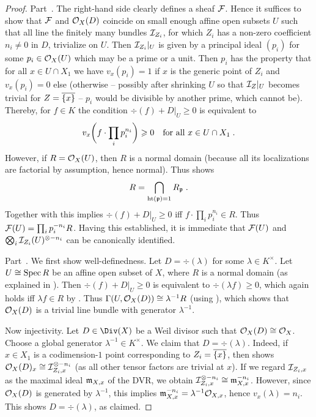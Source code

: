 \documentclass[a4paper,parskip=half,numbers=enddot, DIV=12]{scrreprt}
\renewcommand{\geq}{\geqslant}
\begin{document}
\begin{proof}
	Part~. The right-hand side clearly defines a sheaf $\mathcal{F}$. Hence it suffices to show that $\mathcal{F}$ and $\mathcal{O}_X(D)$ coincide on small enough affine open subsets $U$ such that all line the finitely many bundles $\mathcal{I}_{Z_i}$, for which $Z_i$ has a non-zero coefficient $n_i\neq 0$ in $D$, trivialize on $U$. Then $\mathcal{I}_{Z_i}|_U$ is given by a principal ideal $(p_i)$ for some $p_i\in\mathcal{O}_X(U)$ which may be a prime or a unit. Then $p_i$ has the property that for all $x\in U\cap X_1$ we have $v_x(p_i)=1$ if $x$ is the generic point of $Z_i$ and $v_x(p_i)=0$ else (otherwise -- possibly after shrinking $U$ so that $\mathcal{I}_Z|_U$ becomes trivial for $Z=\overline{\{x\}}$ -- $p_i$ would be divisible by another prime, which cannot be). Thereby, for $f\in K$ the condition $\div(f)+D|_U\geq 0$ is equivalent to
	\begin{align}\lbl{eq:vxf}
		 v_x\bigg(f\cdot\prod_ip_i^{n_i}\bigg)\geq 0\quad\text{for all }x\in U\cap X_1\;.
	\end{align}
	However, if $R=\mathcal{O}_X(U)$, then $R$ is a normal domain (because all its localizations are factorial by assumption, hence normal). Thus \cite[Theorem~11.5]{matsumuraCRT} shows
	\begin{align}\lbl{eq:RpIntersection}
		R=\bigcap_{\hoehe(\pp)=1}R_\pp\;.
	\end{align}
	Together with  this implies $\div(f)+D|_U\geq 0$ iff $f\cdot\prod_ip_i^{n_i}\in R$. Thus $\mathcal{F}(U)=\prod_ip_i^{-n_i}R$. Having this established, it is immediate that $\mathcal{F}(U)$ and $\bigotimes_i\mathcal{I}_{Z_i}(U)^{\otimes -n_i}$ can be canonically identified.
	
	Part~. We first show well-definedness. Let $D=\div(\lambda)$ for some $\lambda \in K^\times$. Let $U\cong \operatorname{Spec} R$ be an affine open subset of $X$, where $R$ is a normal domain (as explained in ). Then $\div(f)+D|_U\geq 0$ is equivalent to $\div(\lambda f)\geq 0$, which again holds iff $\lambda f\in R$ by . Thus $\Gamma(U,\mathcal{O}_X(D))\cong \lambda^{-1}R$ (using ), which shows that $\mathcal{O}_X(D)$ is a trivial line bundle with generator $\lambda^{-1}$.
	
	Now injectivity. Let $D\in\Div(X)$ be a Weil divisor such that $\mathcal{O}_X(D)\cong \mathcal{O}_X$. Choose a global generator $\lambda^{-1}\in K^\times$. We claim that $D=\div(\lambda)$. Indeed, if $x\in X_1$ is a codimension-$1$ point corresponding to $Z_i=\overline{\{x\}}$, then  shows $\mathcal{O}_X(D)_x\cong \mathcal{I}_{Z_i,x}^{\otimes -n_i}$ (as all other tensor factors are trivial at $x$). If we regard $\mathcal{I}_{Z_i,x}$ as the maximal ideal $\mathfrak{m}_{X,x}$ of the DVR, we obtain $\mathcal{I}_{Z_i,x}^{\otimes -n_i}\cong \mathfrak{m}_{X,x}^{-n_i}$. However, since $\mathcal{O}_X(D)$ is generated by $\lambda^{-1}$, this implies $\mathfrak{m}_{X,x}^{-n_i}=\lambda^{-1}\mathcal{O}_{X,x}$, hence $v_x(\lambda)=n_i$. This shows $D=\div(\lambda)$, as claimed.
	

\end{proof}
\end{document}
